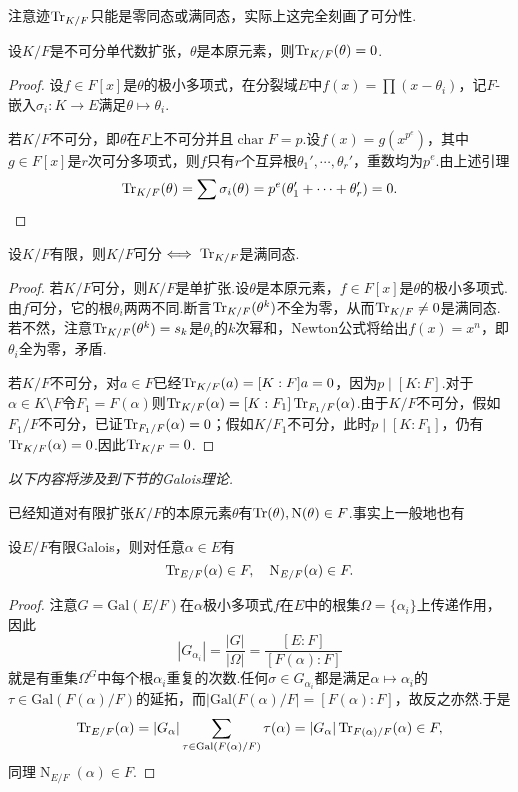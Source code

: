 注意迹$\operatorname{Tr}_{K/F}$只能是零同态或满同态，实际上这完全刻画了可分性.
\begin{lemma*}
    设$K/F$是不可分单代数扩张，$\theta$是本原元素，则$\operatorname{Tr}_{K/F}(\theta)=0$.
\end{lemma*}
\begin{proof}
    设$f\in F[x]$是$\theta$的极小多项式，在分裂域$E$中$f(x)=\prod(x-\theta_i)$，记$F$-嵌入$\sigma_i\colon K\to E$满足$\theta\mapsto\theta_i$.
    
    若$K/F$不可分，即$\theta$在$F$上不可分并且$\operatorname*{char}F=p$.设$f(x)=g(x^{p^e})$，其中$g\in F[x]$是$r$次可分多项式，则$f$只有$r$个互异根$\theta_1',\cdots,\theta_r'$，重数均为$p^e$.由上述引理
    \[
        \operatorname{Tr}_{K/F}(\theta)=\sum\sigma_i(\theta)=p^e(\theta_1'+\cdots+\theta_r')=0.
    \]
\end{proof}
\begin{thm}
    设$K/F$有限，则$K/F$可分$\iff\operatorname{Tr}_{K/F}$是满同态.
\end{thm}
\begin{proof}
    若$K/F$可分，则$K/F$是单扩张.设$\theta$是本原元素，$f\in F[x]$是$\theta$的极小多项式.由$f$可分，它的根$\theta_i$两两不同.断言$\operatorname{Tr}_{K/F}(\theta^k)$不全为零，从而$\operatorname{Tr}_{K/F}\ne 0$是满同态.若不然，注意$\operatorname{Tr}_{K/F}(\theta^k)=s_k$是$\theta_i$的$k$次幂和，Newton公式将给出$f(x)=x^n$，即$\theta_i$全为零，矛盾.

    若$K/F$不可分，对$a\in F$已经$\operatorname{Tr}_{K/F}(a)=[K:F]a=0$，因为$p\mid[K:F]$.对于$\alpha\in K\setminus F$令$F_1=F(\alpha)$则$\operatorname{Tr}_{K/F}(\alpha)=[K:F_1]\operatorname{Tr}_{F_1/F}(\alpha)$.由于$K/F$不可分，假如$F_1/F$不可分，已证$\operatorname{Tr}_{F_1/F}(\alpha)=0$；假如$K/F_1$不可分，此时$p\mid[K:F_1]$，仍有$\operatorname{Tr}_{K/F}(\alpha)=0$.因此$\operatorname{Tr}_{K/F}=0$.
\end{proof}

\emph{以下内容将涉及到下节的Galois理论.}

\medskip 已经知道对有限扩张$K/F$的本原元素$\theta$有$\operatorname{Tr}(\theta),\operatorname*{N}(\theta)\in F$.事实上一般地也有
\begin{prop}
    设$E/F$有限Galois，则对任意$\alpha\in E$有
    \[
        \operatorname{Tr}_{E/F}(\alpha)\in F,\quad\operatorname{N}_{E/F}(\alpha)\in F.
    \]\vspace*{-18pt}
\end{prop}
\begin{proof}
    注意$G=\mathrm{Gal}(E/F)$在$\alpha$极小多项式$f$在$E$中的根集$\Omega=\{\alpha_i\}$上传递作用，因此
    \[
        |G_{\alpha_i}|=\frac{|G|}{|\Omega|}=\frac{[E:F]}{[F(\alpha):F]}
    \]
    就是有重集$\Omega^G$中每个根$\alpha_i$重复的次数.任何$\sigma\in G_{\alpha_i}$都是满足$\alpha\mapsto\alpha_i$的$\tau\in\mathrm{Gal}(F(\alpha)/F)$的延拓，而$|\mathrm{Gal}(F(\alpha)/F|=[F(\alpha):F]$，故反之亦然.于是
    \[
        \operatorname{Tr}_{E/F}(\alpha)=|G_\alpha|\sum_{\tau\in\mathrm{Gal}(F(\alpha)/F)}\tau(\alpha)=|G_\alpha|\operatorname{Tr}_{F(\alpha)/F}(\alpha)\in F,
    \]
    同理$\operatorname{N}_{E/F}(\alpha)\in F$.
\end{proof}

